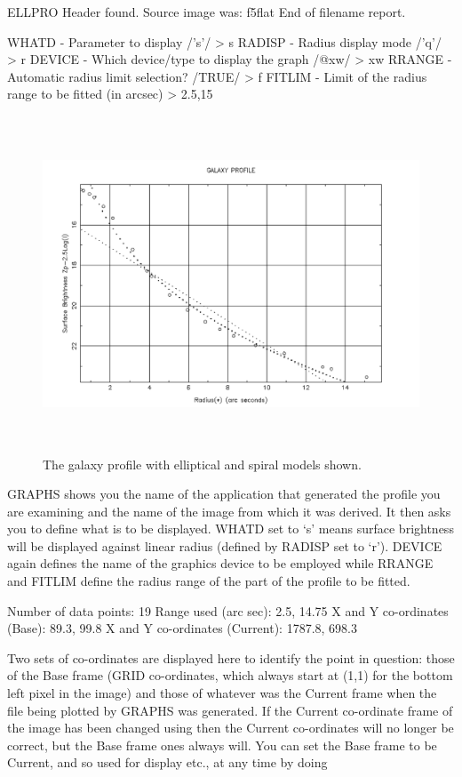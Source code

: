 \documentclass[twoside,11pt]{starlink}
\begin{document}
\begin{terminalv}
ELLPRO Header found.
Source image was: f5flat
End of filename report.

WHATD - Parameter to display /'s'/ > s
RADISP - Radius display mode /'q'/ > r
DEVICE - Which device/type to display the graph /@xw/ > xw
RRANGE - Automatic radius limit selection? /TRUE/ > f
FITLIM - Limit of the radius range to be fitted (in arcsec) > 2.5,15
\end{terminalv}

\begin{figure}[htlb]
\centering
\includegraphics[height=100mm,width=150mm]{sun180_diag5}
\caption{The galaxy profile with elliptical and spiral models shown.}
\end{figure}

GRAPHS shows you the name of the application that generated the
profile you are examining and the name of the image from which
it was derived. It then asks you to define what is to be displayed.
WHATD set to `s' means surface brightness will be displayed against
linear radius (defined by RADISP set to `r'). DEVICE again defines the
name of the graphics device to be employed while RRANGE and FITLIM define the
radius range of the part of the profile to be fitted.

\begin{terminalv}
Number of data points:      19
Range used (arc sec):     2.5,  14.75
X and Y co-ordinates (Base):  89.3, 99.8
X and Y co-ordinates (Current):  1787.8, 698.3
\end{terminalv}

Two sets of co-ordinates are displayed here to identify the point
in question: those of the Base frame (GRID co-ordinates, which
always start at (1,1) for the bottom left pixel in the image)
and those of whatever was the Current frame when the
file being plotted by GRAPHS was generated.
If the Current co-ordinate frame of the image has been changed
using  then the Current co-ordinates
will no longer be correct, but the Base frame ones always will.
You can set the Base frame to be Current,
and so used for display etc.,
at any time by doing
\begin{terminalv}
\end{terminalv}
\end{document}
